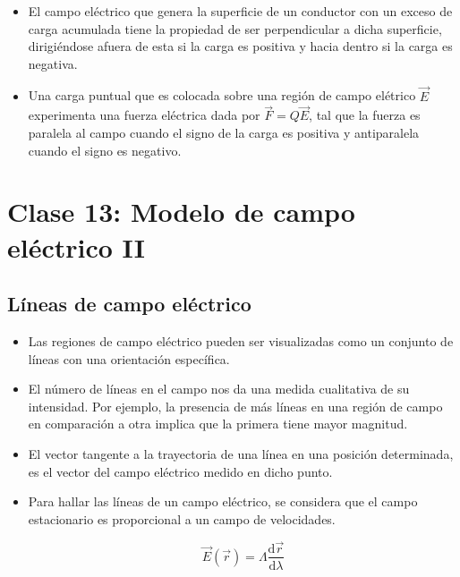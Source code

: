 \documentclass[a4paper,10pt]{article}
\begin{document}
\begin{itemize}
\item El campo el\'ectrico que genera la superficie de un conductor con un exceso de carga
acumulada tiene la propiedad de ser perpendicular a dicha superficie, dirigi\'endose
afuera de esta si la carga es positiva y hacia dentro si la carga es negativa.

\item Una carga puntual que es colocada sobre una regi\'on de campo el\'etrico $\vec{E}$
experimenta una fuerza el\'ectrica dada por $\vec{F}=Q\vec{E}$, tal que la fuerza es
paralela al campo cuando el signo de la carga es positiva y antiparalela cuando el
signo es negativo.

\end{itemize}


\section*{Clase 13: Modelo de campo el\'ectrico II}

\subsection*{Líneas de campo eléctrico}

\begin{itemize}

\item Las regiones de campo el\'ectrico pueden ser visualizadas como un conjunto de
l\'ineas con una orientaci\'on espec\'ifica.

\item El n\'umero de l\'ineas en el campo nos da una medida cualitativa de su intensidad.
Por ejemplo, la presencia de m\'as l\'ineas en una regi\'on de campo en comparaci\'on a otra
implica que la primera tiene mayor magnitud.

\item El vector tangente a la trayectoria de una l\'inea en una  posici\'on determinada,
es el vector del campo el\'ectrico medido en dicho punto.

\item Para hallar las l\'ineas de un campo el\'ectrico, se considera que el campo estacionario
es proporcional a un campo de velocidades.

\begin{equation*}
    \boxed{\vec{E}(\vec{r})=\varLambda\frac{\mathrm{d}\vec{r}}
    {\mathrm{d}\lambda}}
\end{equation*}

\end{itemize}
\end{document}
